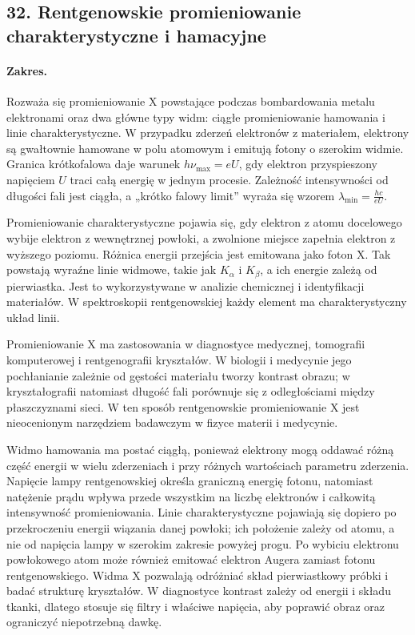\documentclass[11pt,a4paper]{article}
\begin{document}
\subsection{32. Rentgenowskie promieniowanie charakterystyczne i hamacyjne}
\paragraph{Zakres.} Rozważa się promieniowanie X powstające podczas bombardowania metalu elektronami oraz dwa główne typy widm: ciągłe promieniowanie hamowania i linie charakterystyczne. W przypadku zderzeń elektronów z materiałem, elektrony są gwałtownie hamowane w polu atomowym i emitują fotony o szerokim widmie. Granica krótkofalowa daje warunek $h\nu_{\max}=eU$, gdy elektron przyspieszony napięciem $U$ traci całą energię w jednym procesie. Zależność intensywności od długości fali jest ciągła, a „krótko falowy limit” wyraża się wzorem $\lambda_{\min}=\frac{hc}{eU}$.\par
Promieniowanie charakterystyczne pojawia się, gdy elektron z atomu docelowego wybije elektron z wewnętrznej powłoki, a zwolnione miejsce zapełnia elektron z wyższego poziomu. Różnica energii przejścia jest emitowana jako foton X. Tak powstają wyraźne linie widmowe, takie jak $K_\alpha$ i $K_\beta$, a ich energie zależą od pierwiastka. Jest to wykorzystywane w analizie chemicznej i identyfikacji materiałów. W spektroskopii rentgenowskiej każdy element ma charakterystyczny układ linii.\par
Promieniowanie X ma zastosowania w diagnostyce medycznej, tomografii komputerowej i rentgenografii kryształów. W biologii i medycynie jego pochłanianie zależnie od gęstości materiału tworzy kontrast obrazu; w kryształografii natomiast długość fali porównuje się z odległościami między płaszczyznami sieci. W ten sposób rentgenowskie promieniowanie X jest nieocenionym narzędziem badawczym w fizyce materii i medycynie.\par

Widmo hamowania ma postać ciągłą, ponieważ elektrony mogą oddawać różną część energii w wielu zderzeniach i przy różnych wartościach parametru zderzenia. Napięcie lampy rentgenowskiej określa graniczną energię fotonu, natomiast natężenie prądu wpływa przede wszystkim na liczbę elektronów i całkowitą intensywność promieniowania. Linie charakterystyczne pojawiają się dopiero po przekroczeniu energii wiązania danej powłoki; ich położenie zależy od atomu, a nie od napięcia lampy w szerokim zakresie powyżej progu. Po wybiciu elektronu powłokowego atom może również emitować elektron Augera zamiast fotonu rentgenowskiego. Widma X pozwalają odróżniać skład pierwiastkowy próbki i badać strukturę kryształów. W diagnostyce kontrast zależy od energii i składu tkanki, dlatego stosuje się filtry i właściwe napięcia, aby poprawić obraz oraz ograniczyć niepotrzebną dawkę.
\par
\end{document}
